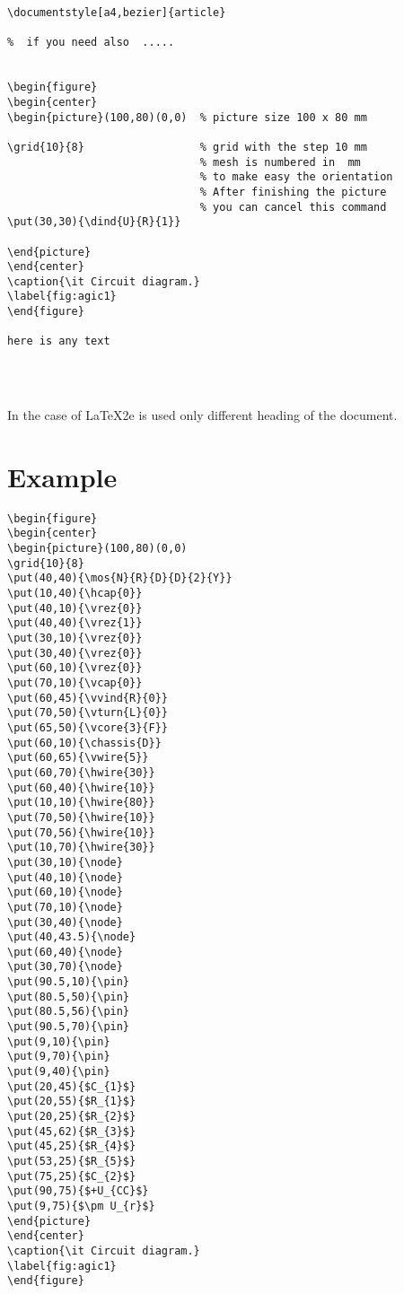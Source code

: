  \begin{verbatim}
\documentstyle[a4,bezier]{article}

%  if you need also  .....  


\begin{figure}
\begin{center}
\begin{picture}(100,80)(0,0)  % picture size 100 x 80 mm

\grid{10}{8}                  % grid with the step 10 mm
                              % mesh is numbered in  mm
                              % to make easy the orientation
                              % After finishing the picture
                              % you can cancel this command
\put(30,30){\dind{U}{R}{1}}

\end{picture}
\end{center}
\caption{\it Circuit diagram.}
\label{fig:agic1}
\end{figure}

here is any text




\end{verbatim}

In the case of \LaTeX 2e  is used only different heading
of the document.

\section{Example}

\begin{verbatim}
\begin{figure}
\begin{center}
\begin{picture}(100,80)(0,0)
\grid{10}{8}
\put(40,40){\mos{N}{R}{D}{D}{2}{Y}}
\put(10,40){\hcap{0}}
\put(40,10){\vrez{0}}
\put(40,40){\vrez{1}}
\put(30,10){\vrez{0}}
\put(30,40){\vrez{0}}
\put(60,10){\vrez{0}}
\put(70,10){\vcap{0}}
\put(60,45){\vvind{R}{0}}
\put(70,50){\vturn{L}{0}}
\put(65,50){\vcore{3}{F}}
\put(60,10){\chassis{D}}
\put(60,65){\vwire{5}}
\put(60,70){\hwire{30}}
\put(60,40){\hwire{10}}
\put(10,10){\hwire{80}}
\put(70,50){\hwire{10}}
\put(70,56){\hwire{10}}
\put(10,70){\hwire{30}}
\put(30,10){\node}
\put(40,10){\node}
\put(60,10){\node}
\put(70,10){\node}
\put(30,40){\node}
\put(40,43.5){\node}
\put(60,40){\node}
\put(30,70){\node}
\put(90.5,10){\pin}
\put(80.5,50){\pin}
\put(80.5,56){\pin}
\put(90.5,70){\pin}
\put(9,10){\pin}
\put(9,70){\pin}
\put(9,40){\pin}
\put(20,45){$C_{1}$}
\put(20,55){$R_{1}$}
\put(20,25){$R_{2}$}
\put(45,62){$R_{3}$}
\put(45,25){$R_{4}$}
\put(53,25){$R_{5}$}
\put(75,25){$C_{2}$}
\put(90,75){$+U_{CC}$}
\put(9,75){$\pm U_{r}$}
\end{picture}
\end{center}
\caption{\it Circuit diagram.}
\label{fig:agic1}
\end{figure}


\end{verbatim}


